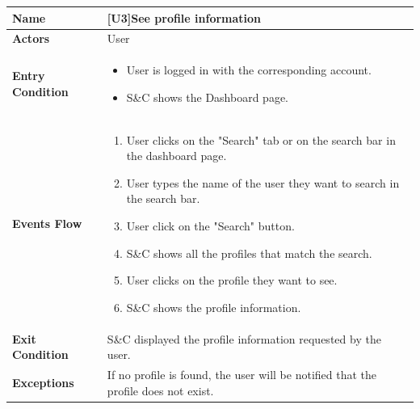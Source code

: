 \begin{center}
    \begin{tabular}{|p{9em}|p{27em}|}
        \hline
        \rowcolor{bluepoli!40} %
        \textbf{Name} & \textbf{[U3]See profile information} \\
        \hline
        \textbf{Actors} & User \\
        \hline
        \textbf{Entry Condition} & 
        \begin{itemize}
            \item User is logged in with the corresponding account.
            \item S\&C shows the Dashboard page.
        \end{itemize} \\
        \hline
        \textbf{Events Flow} & 
        \begin{enumerate}
            \item User clicks on the "Search" tab or on the search bar in the dashboard page. 
            \item User types the name of the user they want to search in the search bar.
            \item User click on the "Search" button.
            \item S\&C shows all the profiles that match the search.
            \item User clicks on the profile they want to see.
            \item S\&C shows the profile information.
        \end{enumerate} \\
        \hline
        \textbf{Exit Condition} & 
            S\&C displayed the profile information requested by the user.\\
        \hline
        \textbf{Exceptions} &
            If no profile is found, the user will be notified that the profile does not exist.\\
        \hline
    \end{tabular}
\end{center}

